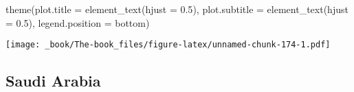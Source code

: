 \documentclass[
]{book}
\newenvironment{Shaded}{\begin{snugshade}}{\end{snugshade}}
\newcommand{\AttributeTok}[1]{\textcolor[rgb]{0.77,0.63,0.00}{#1}}
\newcommand{\FloatTok}[1]{\textcolor[rgb]{0.00,0.00,0.81}{#1}}
\newcommand{\FunctionTok}[1]{\textcolor[rgb]{0.00,0.00,0.00}{#1}}
\newcommand{\NormalTok}[1]{#1}
\newcommand{\StringTok}[1]{\textcolor[rgb]{0.31,0.60,0.02}{#1}}
\begin{document}
\begin{Shaded}
\begin{Highlighting}[]
  \FunctionTok{theme}\NormalTok{(}\AttributeTok{plot.title =} \FunctionTok{element\_text}\NormalTok{(}\AttributeTok{hjust =} \FloatTok{0.5}\NormalTok{),}
        \AttributeTok{plot.subtitle =} \FunctionTok{element\_text}\NormalTok{(}\AttributeTok{hjust =} \FloatTok{0.5}\NormalTok{),}
        \AttributeTok{legend.position =} \StringTok{\textquotesingle{}bottom\textquotesingle{}}\NormalTok{)}
\end{Highlighting}
\end{Shaded}

\texttt{[image: \_book/The-book\_files/figure-latex/unnamed-chunk-174-1.pdf]}

\hypertarget{saudi-arabia-1}{%
\subsection{Saudi Arabia}\label{saudi-arabia-1}}
\end{document}
